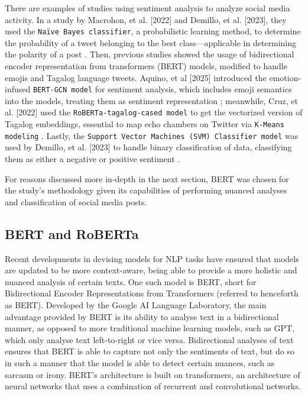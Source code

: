 There are examples of studies using sentiment analysis to analyze social media activity. In a study by Macrohon, et al. [2022] and Demillo, et al. [2023], they used the \texttt{Naïve Bayes classifier}, a probabilistic learning method, to determine the probability of a tweet belonging to the best class—applicable in determining the polarity of a post \cite{RRL_Macrohon-2022,RRL_Demillo-2025}. Then, previous studies showed the usage of bidirectional encoder representation from transformers (BERT) models, modified to handle emojis and Tagalog language tweets. Aquino, et al [2025] introduced the emotion-infused \texttt{BERT-GCN model} for sentiment analysis, which includes emoji semantics into the models, treating them as sentiment representation  \cite{RRL_Aquino-2025}; meanwhile, Cruz, et al. [2022] used the \texttt{RoBERTa-tagalog-cased model} to get the vectorized version of Tagalog embeddings, essential to map echo chambers on Twitter via \texttt{K-Means modeling} \cite{RRL_Cruz-2022}. Lastly, the \texttt{Support Vector Machines (SVM) Classifier model} was used by Demillo, et al. [2023] to handle binary classification of data, classifying them as either a negative or positive sentiment \cite{RRL_Demillo-2023}.

For reasons discussed more in-depth in the next section, BERT was chosen for the study’s methodology given its capabilities of performing nuanced analyses and classification of social media posts.

\subsection{BERT and RoBERTa}
Recent developments in devising models for NLP tasks have ensured that models are updated to be more context-aware, being able to provide a more holistic and nuanced analysis of certain texts. One such model is BERT, short for Bidirectional Encoder Representations from Transformers (referred to henceforth as BERT). Developed by the Google AI Language Laboratory, the main advantage provided by BERT is its ability to analyse text in a bidirectional manner, as opposed to more traditional machine learning models, such as GPT, which only analyse text left-to-right or vice versa. Bidirectional analyses of text ensures that BERT is able to capture not only the sentiments of text, but do so in such a manner that the model is able to detect certain nuances, such as sarcasm or irony. BERT’s architecture is built on transformers, an architecture of neural networks that uses a combination of recurrent and convolutional networks.

